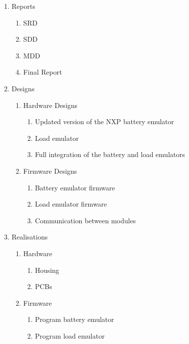 

\begin{enumerate}
    \item Reports
    \begin{enumerate}
        \item SRD
        \item SDD
        \item MDD
        \item Final Report
    \end{enumerate}
    \item Designs
    \begin{enumerate}
        \item Hardware Designs
        \begin{enumerate}
            \item Updated version of the NXP battery emulator
            \item Load emulator
            \item Full integration of the battery and load emulators
        \end{enumerate}
        \item Firmware Designs
        \begin{enumerate}
            \item Battery emulator firmware
            \item Load emulator firmware
            \item Communication between modules
        \end{enumerate}
    \end{enumerate}
    \item Realisations
    \begin{enumerate}
        \item Hardware
        \begin{enumerate}
            \item Housing
            \item PCBs
        \end{enumerate}
        \item Firmware
        \begin{enumerate}
            \item Program battery emulator
            \item Program load emulator 
        \end{enumerate}
    \end{enumerate}
\end{enumerate}
